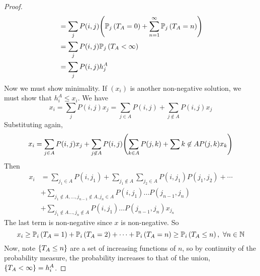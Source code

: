 \begin{proof}
\begin{align*}
		                       & = \sum_j P(i,j) \qty( \mathbb{P}_{j}\left({T_A = 0}\right) + \sum_{n=1}^\infty \mathbb{P}_{j}\left({T_A = n}\right) )                                            \\
		                       & = \sum_j P(i,j) \mathbb{P}_{j}\left({T_A < \infty}\right)                                                                                     \\
		                       & = \sum_j P(i,j) h_j^A
	\end{align*}
	Now we must show minimality.
	If \( (x_i) \) is another non-negative solution, we must show that \( h_i^A \leq x_i \).
	We have
	\[
		x_i = \sum_j P(i,j) x_j = \sum_{j \in A} P(i,j) + \sum_{j \not\in A} P(i,j) x_j
	\]
	Substituting again,
	\[
		x_i = \sum_{j \in A} P(i,j) x_j + \sum_{j \not\in A} P(i,j) \qty( \sum_{k \in A} P(j,k) + \sum{k \not\in A} P(j,k) x_k )
	\]
	Then
	\begin{align*}
		x_i & = \sum_{j_1 \in A} P(i,j_1) + \sum_{j_1 \not\in A} \sum_{j_2 \in A} P(i,j_1)P(j_1,j_2) + \cdots \\
		    & + \sum_{j_1 \not\in A, \dots, j_{n-1} \not\in A, j_n \in A} P(i,j_1)\dots P(j_{n-1},j_n)        \\
		    & + \sum_{j_1 \not\in A \dots, j_n \not\in A} P(i,j_1)\dots P(j_{n-1},j_n) x_{j_n}
	\end{align*}
	The last term is non-negative since \( x \) is non-negative.
	So
	\[
		x_i \geq \mathbb{P}_{i}\left({T_A = 1}\right) + \mathbb{P}_{i}\left({T_A = 2}\right) + \dots + \mathbb{P}_{i}\left({T_A = n}\right) \geq \mathbb{P}_{i}\left({T_A \leq n}\right),\ \forall n \in \mathbb N
	\]
	Now, note \( \qty{T_A \leq n} \) are a set of increasing functions of \( n \), so by continuity of the probability measure, the probability increases to that of the union, \( \qty{T_A < \infty} = h_i^A \).
\end{proof}
